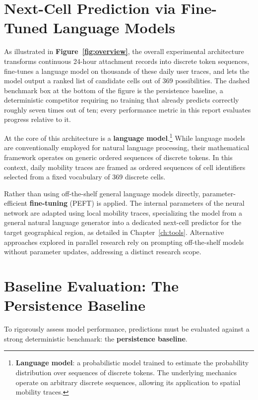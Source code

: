 \section{Next-Cell Prediction via Fine-Tuned Language Models}



As illustrated in \textbf{Figure~\ref{fig:overview}}, the overall experimental architecture transforms continuous 24-hour attachment records into discrete token sequences, fine-tunes a language model on thousands of these daily user traces, and lets the model output a ranked list of candidate cells out of 369 possibilities. The dashed benchmark box at the bottom of the figure is the persistence baseline, a deterministic competitor requiring no training that already predicts correctly roughly seven times out of ten; every performance metric in this report evaluates progress relative to it.

At the core of this architecture is a \textbf{language model}.\footnote{\textbf{Language model}: a probabilistic model trained to estimate the probability distribution over sequences of discrete tokens. The underlying mechanics operate on arbitrary discrete sequences, allowing its application to spatial mobility traces.} While language models are conventionally employed for natural language processing, their mathematical framework operates on generic ordered sequences of discrete tokens. In this context, daily mobility traces are framed as ordered sequences of cell identifiers selected from a fixed vocabulary of 369 discrete cells.

Rather than using off-the-shelf general language models directly, parameter-efficient \textbf{fine-tuning} (PEFT) is applied. The internal parameters of the neural network are adapted using local mobility traces, specializing the model from a general natural language generator into a dedicated next-cell predictor for the target geographical region, as detailed in Chapter~\ref{ch:tools}. Alternative approaches explored in parallel research rely on prompting off-the-shelf models without parameter updates, addressing a distinct research scope.

\section{Baseline Evaluation: The Persistence Baseline}

To rigorously assess model performance, predictions must be evaluated against a strong deterministic benchmark: the \textbf{persistence baseline}.

